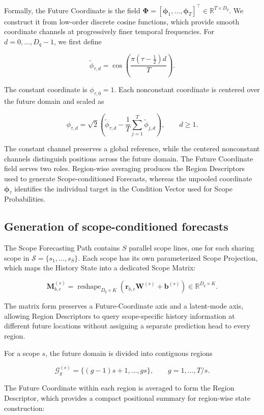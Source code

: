 Formally, the Future Coordinate is the field $\boldsymbol\Phi=[\boldsymbol\phi_1,\ldots,\boldsymbol\phi_T]^\top\in\mathbb R^{T\times D_q}$. We construct it from low-order discrete cosine functions, which provide smooth coordinate channels at progressively finer temporal frequencies. For $d=0,\ldots,D_q-1$, we first define

\[
\widetilde\phi_{\tau,d}
=
\cos\!\left(
\frac{\pi(\tau-\tfrac12)d}{T}
\right).
\]


The constant coordinate is $\phi_{\tau,0}=1$. Each nonconstant coordinate is centered over the future domain and scaled as

\[
\phi_{\tau,d}
=
\sqrt{2}
\left(
\widetilde\phi_{\tau,d}
-
\frac{1}{T}
\sum_{j=1}^{T}
\widetilde\phi_{j,d}
\right),
\qquad d\geq 1.
\]


The constant channel preserves a global reference, while the centered nonconstant channels distinguish positions across the future domain. The Future Coordinate field serves two roles. Region-wise averaging produces the Region Descriptors used to generate Scope-conditioned Forecasts, whereas the unpooled coordinate $\boldsymbol\phi_\tau$ identifies the individual target in the Condition Vector used for Scope Probabilities.

\subsection{Generation of scope-conditioned forecasts}


The Scope Forecasting Path contains $S$ parallel scope lines, one for each sharing scope in $\mathcal S=\{s_1,\ldots,s_S\}$. Each scope has its own parameterized Scope Projection, which maps the History State into a dedicated Scope Matrix:

\[
\mathbf M_{b,c}^{(s)}
=
\operatorname{reshape}_{D_q\times K}
\left(
\mathbf r_{b,c}\mathbf W^{(s)}
+
\mathbf b^{(s)}
\right)
\in\mathbb R^{D_q\times K}.
\]


The matrix form preserves a Future-Coordinate axis and a latent-mode axis, allowing Region Descriptors to query scope-specific history information at different future locations without assigning a separate prediction head to every region.

For a scope $s$, the future domain is divided into contiguous regions

\[
\mathcal G_g^{(s)}
=
\{(g-1)s+1,\ldots,gs\},
\qquad
g=1,\ldots,T/s.
\]


The Future Coordinate within each region is averaged to form the Region Descriptor, which provides a compact positional summary for region-wise state construction:

